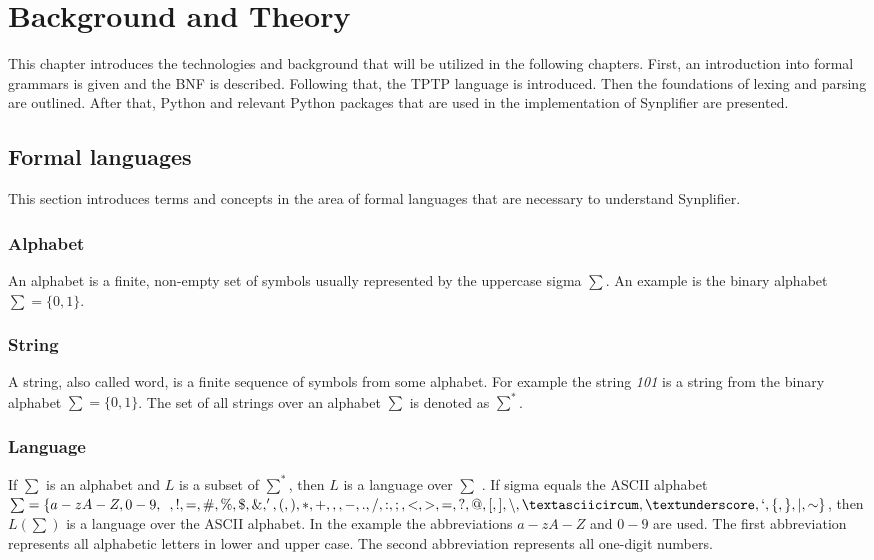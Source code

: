 
\chapter{Background and Theory}\label{cha:Background}

This chapter introduces the technologies and background that will be utilized in the following chapters. First, an introduction into formal grammars is given and the \acf{BNF} is described. Following that, the \ac{TPTP} language is introduced. Then the foundations of lexing and parsing are outlined. After that, Python and relevant Python packages that are used in the implementation of \ac{Synplifier} are presented.

\section{Formal languages}\label{sec:BackgroundFormalLanguage}

This section introduces terms and concepts in the area of formal languages that are necessary to understand \ac{Synplifier}.

\subsection{Alphabet}
An alphabet is a finite, non-empty set of symbols usually represented by the uppercase sigma $\sum$.
An example is the binary alphabet $\sum = \{0,1\}$. \cite{AutomataTheory.2007}

\subsection{String}
A string, also called word, is a finite sequence of symbols from some alphabet. For example the string \textit{101} is a string from the binary alphabet $\sum = \{0,1\}$.
The set of all strings over an alphabet $\sum$ is denoted as $\sum ^{*}$. \cite{AutomataTheory.2007}

\subsection{Language}
If $\sum$ is an alphabet and $L$ is a subset of $\sum ^*$, then $L$ is a language over $\sum$ \cite{AutomataTheory.2007}.
If sigma equals the \ac{ASCII} alphabet $\sum = \{a-zA-Z,0-9,\enspace,!,=,\#,\%,\$,\&,',(,),*,+,,,-,.,/,:,;,<,>,=,?,@,[,],\backslash ,\textasciicircum ,\textunderscore ,`,\{,\},\mid,\sim\}$, then $L(\sum)$ is a language over the \ac{ASCII} alphabet. In the example the abbreviations $a-zA-Z$ and $0-9$ are used. The first abbreviation represents all alphabetic letters in lower and upper case. The second abbreviation represents all one-digit numbers.

